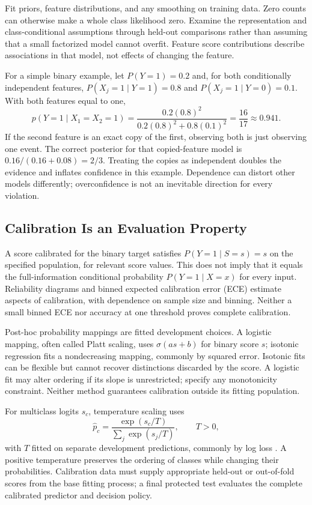 Fit priors, feature distributions, and any smoothing on training data. Zero counts can otherwise make a whole class likelihood zero. Examine the representation and class-conditional assumptions through held-out comparisons rather than assuming that a small factorized model cannot overfit. Feature score contributions describe associations in that model, not effects of changing the feature.

For a simple binary example, let $P(Y=1)=0.2$ and, for both conditionally independent features, $P(X_j=1\mid Y=1)=0.8$ and $P(X_j=1\mid Y=0)=0.1$. With both features equal to one,
\[
p(Y=1\mid X_1=X_2=1)=
\frac{0.2(0.8)^2}{0.2(0.8)^2+0.8(0.1)^2}
=\frac{16}{17}\approx0.941.
\]
If the second feature is an exact copy of the first, observing both is just observing one event. The correct posterior for that copied-feature model is $0.16/(0.16+0.08)=2/3$. Treating the copies as independent doubles the evidence and inflates confidence in this example. Dependence can distort other models differently; overconfidence is not an inevitable direction for every violation.

\subsection{Calibration Is an Evaluation Property}

A score calibrated for the binary target satisfies $P(Y=1\mid S=s)=s$ on the specified population, for relevant score values. This does not imply that it equals the full-information conditional probability $P(Y=1\mid X=x)$ for every input. Reliability diagrams and binned expected calibration error (ECE) estimate aspects of calibration, with dependence on sample size and binning. Neither a small binned ECE nor accuracy at one threshold proves complete calibration.

Post-hoc probability mappings are fitted development choices. A logistic mapping, often called Platt scaling, uses $\sigma(as+b)$ for binary score $s$; isotonic regression fits a nondecreasing mapping, commonly by squared error. Isotonic fits can be flexible but cannot recover distinctions discarded by the score. A logistic fit may alter ordering if its slope is unrestricted; specify any monotonicity constraint. Neither method guarantees calibration outside its fitting population.

For multiclass logits $s_c$, temperature scaling uses
\[
\hat p_c=\frac{\exp(s_c/T)}{\sum_j\exp(s_j/T)},\qquad T>0,
\]
with $T$ fitted on separate development predictions, commonly by log loss \citep{guo2017}. A positive temperature preserves the ordering of classes while changing their probabilities. Calibration data must supply appropriate held-out or out-of-fold scores from the base fitting process; a final protected test evaluates the complete calibrated predictor and decision policy.

